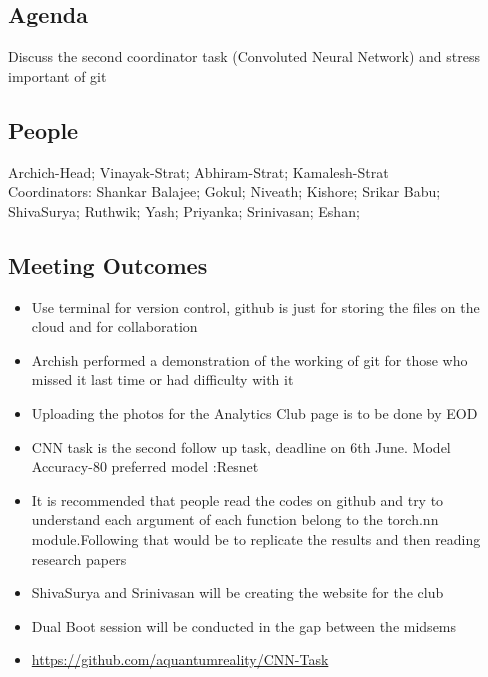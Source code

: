 \documentclass[11pt]{scrartcl}
\begin{document}
\subsection{Agenda}
Discuss the second coordinator task (Convoluted Neural Network) and stress important of git
\subsection{People}
Archich-Head;
Vinayak-Strat;
Abhiram-Strat;
Kamalesh-Strat\\
Coordinators:
Shankar Balajee;
Gokul;
Niveath;
Kishore;
Srikar Babu;
ShivaSurya;
Ruthwik;
Yash;
Priyanka;
Srinivasan;
Eshan;
\subsection{Meeting Outcomes}
\begin{itemize}
    \item Use terminal for version control, github is just for storing the files on the cloud and for collaboration
    \item Archish performed a demonstration of the working of git for those who missed it last time or had difficulty with it
    \item Uploading the photos for the Analytics Club page is to be done by EOD
    \item CNN task is the second follow up task, deadline on 6th June. Model Accuracy-80 %
    preferred model :Resnet
    \item It is recommended that people read the codes on github and try to understand each argument of each function belong to the torch.nn module.Following that would be to replicate the results and then reading research papers
    \item ShivaSurya and Srinivasan will be creating the website for the club 
    \item Dual Boot session will be conducted in the gap between the midsems
    \item \url{https://github.com/aquantumreality/CNN-Task}
\end{itemize}
\end{document}
